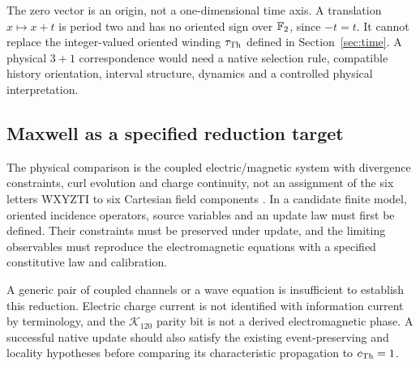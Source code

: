 The zero vector is an origin, not a one-dimensional time axis. A translation $x\mapsto x+t$ is period two and has no oriented sign over $\mathbb F_2$, since $-t=t$. It cannot replace the integer-valued oriented winding $\tau_{\rm Th}$ defined in Section~\ref{sec:time}. A physical $3+1$ correspondence would need a native selection rule, compatible history orientation, interval structure, dynamics and a controlled physical interpretation.

\subsection{Maxwell as a specified reduction target}
The physical comparison is the coupled electric/magnetic system with divergence constraints, curl evolution and charge continuity, not an assignment of the six letters WXYZTI to six Cartesian field components \citep{feynmanmaxwell}. In a candidate finite model, oriented incidence operators, source variables and an update law must first be defined. Their constraints must be preserved under update, and the limiting observables must reproduce the electromagnetic equations with a specified constitutive law and calibration.

A generic pair of coupled channels or a wave equation is insufficient to establish this reduction. Electric charge current is not identified with information current by terminology, and the $\mathcal K_{120}$ parity bit is not a derived electromagnetic phase. A successful native update should also satisfy the existing event-preserving and locality hypotheses before comparing its characteristic propagation to $c_{\rm Th}=1$.
